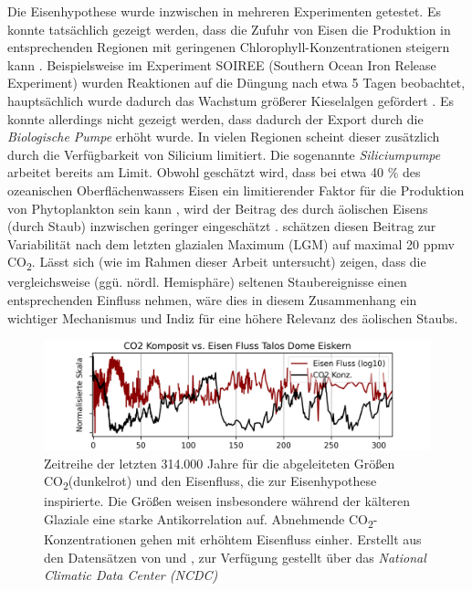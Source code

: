 \documentclass[12pt,a4paper,onecolumn]{scrartcl}
\newcommand{\cotwo}{CO\textsubscript{2}}
\begin{document}
Die Eisenhypothese wurde inzwischen in mehreren Experimenten getestet. Es konnte tatsächlich gezeigt werden, dass die Zufuhr von Eisen die Produktion in entsprechenden Regionen mit geringenen Chlorophyll-Konzentrationen steigern kann \citep{Boyd.2007}. Beispielsweise im Experiment SOIREE (Southern Ocean Iron Release Experiment) wurden Reaktionen auf die Düngung nach etwa 5 Tagen beobachtet, hauptsächlich wurde dadurch das Wachstum größerer Kieselalgen gefördert \citep{Trull.2001}. Es konnte allerdings nicht gezeigt werden, dass dadurch der Export durch die \textit{Biologische Pumpe} erhöht wurde. In vielen Regionen scheint dieser zusätzlich durch die Verfügbarkeit von Silicium limitiert. Die sogenannte \textit{Siliciumpumpe} arbeitet bereits am Limit. Obwohl geschätzt wird, dass bei etwa 40 \% des ozeanischen Oberflächenwassers Eisen ein limitierender Faktor für die Produktion von Phytoplankton sein kann \citep{Emerson.2009}, wird der Beitrag des durch äolischen Eisens (durch Staub) inzwischen geringer eingeschätzt \citep{Tagliabue.2017}. \citet{Vallelonga.2013} schätzen diesen Beitrag zur Variabilität nach dem letzten glazialen Maximum (LGM) auf maximal 20 ppmv \cotwo . Lässt sich (wie im Rahmen dieser Arbeit untersucht) zeigen, dass die vergleichsweise (ggü. nördl. Hemisphäre) seltenen Staubereignisse einen entsprechenden Einfluss nehmen, wäre dies in diesem Zusammenhang ein wichtiger Mechanismus und Indiz für eine höhere Relevanz des äolischen Staubs.

\begin{figure}[ht]
\centering
\includegraphics[width=\textwidth]{bilder/co2_iron.png}
\caption{ Zeitreihe der letzten 314.000 Jahre für die abgeleiteten Größen \cotwo (dunkelrot) und den Eisenfluss, die zur Eisenhypothese inspirierte. Die Größen weisen insbesondere während der kälteren Glaziale eine starke Antikorrelation auf. Abnehmende \cotwo -Konzentrationen gehen mit erhöhtem Eisenfluss einher. Erstellt aus den Datensätzen von \cite{Bereiter.2015} und \cite{Vallelonga.2013}, zur Verfügung gestellt über das \textit{National Climatic Data Center (NCDC) }  }   \label{fig:co2iron}
\end{figure}
\end{document}
